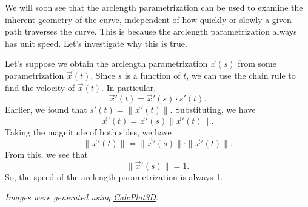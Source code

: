 \documentclass{ximera}
\begin{document}
We will soon see that the arclength parametrization can be used to examine the inherent geometry of the curve, independent of how quickly or slowly a given path traverses the curve. This is because the arclength parametrization always has unit speed. Let's investigate why this is true.

Let's suppose we obtain the arclength parametrization $\vec{x}(s)$ from some parametrization $\vec{x}(t)$. Since $s$ is a function of $t$, we can use the chain rule to find the velocity of $\vec{x}(t)$. In particular,
\[
\vec{x}'(t) = \vec{x}'(s)\cdot s'(t).
\]
Earlier, we found that $s'(t) = \|\vec{x}'(t)\|$. Substituting, we have
\[
\vec{x}'(t) = \vec{x}'(s)\|\vec{x}'(t)\|.
\]
Taking the magnitude of both sides, we have
\[
\|\vec{x}'(t)\| = \|\vec{x}'(s)\|\cdot \|\vec{x}'(t)\|.
\]
From this, we see that
\[
\|\vec{x}'(s)\| = 1.
\]
So, the speed of the arclength parametrization is always 1.

\textit{Images were generated using \href{https://www.monroecc.edu/faculty/paulseeburger/calcnsf/CalcPlot3D/}{CalcPlot3D}.}
\end{document}
